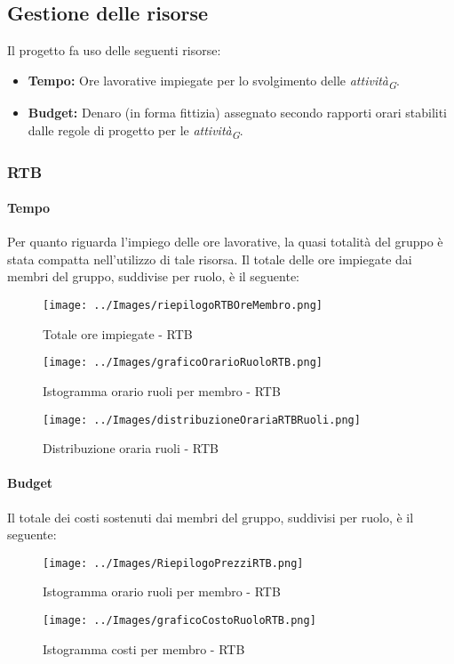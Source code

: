 \subsection{Gestione delle risorse}
Il progetto fa uso delle seguenti risorse:

\begin{itemize}
  \item \textbf{Tempo:} Ore lavorative impiegate per lo svolgimento delle \textit{attività}\textsubscript{\textit{G}}.
  \item \textbf{Budget:} Denaro (in forma fittizia) assegnato secondo rapporti orari stabiliti dalle regole di progetto per le \textit{attività}\textsubscript{\textit{G}}.
\end{itemize}
\subsubsection{RTB}
\paragraph{Tempo}
Per quanto riguarda l’impiego delle ore lavorative, la quasi totalità del gruppo è stata
compatta nell’utilizzo di tale risorsa.
Il totale delle ore impiegate dai membri del gruppo, suddivise per ruolo, è il seguente:
\begin{figure}[H]
    \centering
    \texttt{[image: ../Images/riepilogoRTBOreMembro.png]}
    \caption{Totale ore impiegate - RTB}
    \label{fig:Tot_oreRTB}
\end{figure}
\begin{figure}[H]
    \centering
    \texttt{[image: ../Images/graficoOrarioRuoloRTB.png]}
    \caption{Istogramma orario ruoli per membro  - RTB}
    \label{fig:GraficoOreRTB}
\end{figure}
\begin{figure}[H]
    \centering
    \texttt{[image: ../Images/distribuzioneOrariaRTBRuoli.png]}
    \caption{Distribuzione oraria ruoli  - RTB}
    \label{fig:GraficoDistribuzioneOreRTB}
\end{figure}


\paragraph{Budget}
Il totale dei costi sostenuti dai membri del gruppo, suddivisi per ruolo, è il seguente:
\begin{figure}[H]
    \centering
    \texttt{[image: ../Images/RiepilogoPrezziRTB.png]}
    \caption{Istogramma orario ruoli per membro  - RTB}
    \label{fig:CostiRTB}
\end{figure}
\begin{figure}[H]
    \centering
    \texttt{[image: ../Images/graficoCostoRuoloRTB.png]}
    \caption{Istogramma costi per membro  - RTB}
    \label{fig:GraficoCostoRTB}
\end{figure}